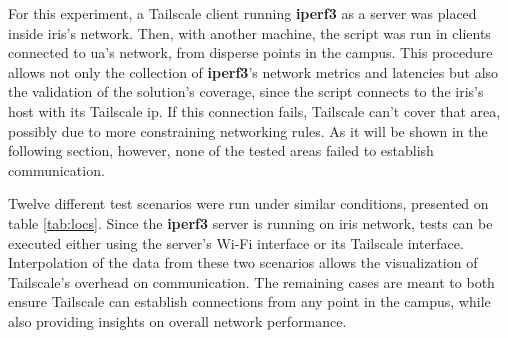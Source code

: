\documentclass[11pt,twoside,a4paper]{report}
\begin{document}
For this experiment, a Tailscale client running \textbf{iperf3} as a server was placed inside \ac{iris}'s network. Then, with another machine, the script was run in clients connected to \ac{ua}'s network, from disperse points in the campus. This procedure allows not only the collection of \textbf{iperf3}'s network metrics and latencies but also the validation of the solution's coverage, since the script connects to the \ac{iris}'s host with its Tailscale \ac{ip}. If this connection fails, Tailscale can't cover that area, possibly due to more constraining networking rules. As it will be shown in the following section, however, none of the tested areas failed to establish communication.

Twelve different test scenarios were run under similar conditions, presented on table \ref{tab:locs}. Since the \textbf{iperf3} server is running on \ac{iris} network, tests can be executed either using the server's Wi-Fi interface or its Tailscale interface. Interpolation of the data from these two scenarios allows the visualization of Tailscale's overhead on communication. The remaining cases are meant to both ensure Tailscale can establish connections from any point in the campus, while also providing insights on overall network performance.
\fi
\end{document}
